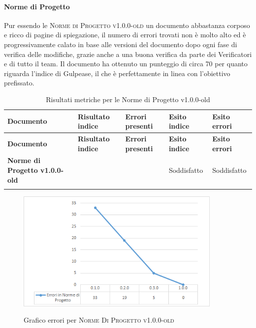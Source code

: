 \documentclass[../piano-di-qualifica.tex]{subfiles}
\begin{document}
\paragraph{Norme di Progetto}
\label{sub:norme_di_progetto}
Pur essendo le \textsc{Norme di Progetto v1.0.0-old} un documento abbastanza corposo e ricco di pagine di spiegazione, il numero di errori trovati non è molto alto ed è progressivamente calato in base alle versioni del documento dopo ogni fase di verifica delle modifiche, grazie anche a una buona verifica da parte dei Verificatori e di tutto il team.
Il documento ha ottenuto un punteggio di circa 70 per quanto riguarda l'indice di Gulpease, il che è perfettamente in linea con l'obiettivo prefissato.

\renewcommand{\arraystretch}{2} %
\begin{longtable}[H]{>{\centering\bfseries}m{6cm} >{\centering}m{2cm} >{\centering}m{2.5cm} >{\centering}m{2.5cm} >{\centering\arraybackslash}m{2.5cm}}  
  \rowcolor{lightgray}
  {\textbf{Documento}} & {\textbf{Risultato indice}} & {\textbf{Errori presenti}} & {\textbf{Esito indice}} & {\textbf{Esito errori}}  \\
  \endfirsthead%
  \rowcolor{lightgray}
  {\textbf{Documento}} & {\textbf{Risultato indice}} & {\textbf{Errori presenti}} & {\textbf{Esito indice}} & {\textbf{Esito errori}}  \\
  \endhead%
  \textbf{Norme di Progetto v1.0.0-old} &  70                & 0               & Soddisfatto & Soddisfatto \\
  \caption{Risultati metriche per le Norme di Progetto v1.0.0-old}
  \label{tab:my-table}
\end{longtable}

    \begin{figure}[H]
        \centering
        \includegraphics[width=10cm]{img/erroriNorme.png}
        \label{fig:scice_documenti}
        \caption{Grafico errori per \textsc{Norme Di Progetto v1.0.0-old}}
    \end{figure}
\end{document}
